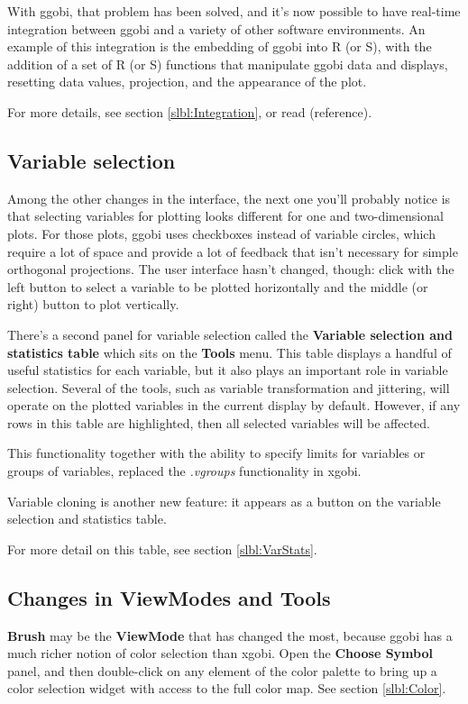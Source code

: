 \documentclass[11pt]{article}
\begin{document}
With ggobi, that problem has been solved, and it's now possible
to have real-time integration between ggobi and a variety of
other software environments.  An example of this integration is
the embedding of ggobi into R (or S), with the addition of a set of
R (or S) functions that manipulate ggobi data and displays,
resetting data values, projection, and the appearance of the plot.

For more details, see section \ref{slbl:Integration}, or read
(reference).

\subsection {Variable selection}

Among the other changes in the interface, the next one you'll
probably notice is that selecting variables for plotting looks
different for one and two-dimensional plots.  For those plots, ggobi
uses checkboxes instead of variable circles, which require a lot of
space and provide a lot of feedback that isn't necessary for simple
orthogonal projections.  The user interface hasn't changed, though:
click with the left button to select a variable to be plotted
horizontally and the middle (or right) button to plot vertically.

There's a second panel for variable selection called the {\bf
Variable selection and statistics table} which sits on the {\bf
Tools} menu.  This table displays a handful of useful statistics for
each variable, but it also plays an important role in variable
selection.  Several of the tools, such as variable transformation and
jittering, will operate on the plotted variables in the current
display by default.  However, if any rows in this table are highlighted,
then all selected variables will be affected. 

This functionality together with the ability to specify limits
for variables or groups of variables, replaced the {\em .vgroups}
functionality in xgobi.

Variable cloning is another new feature: it appears as a button
on the variable selection and statistics table.

For more detail on this table, see section \ref{slbl:VarStats}.

\subsection{Changes in ViewModes and Tools}

{\bf Brush} may be the {\bf ViewMode} that has changed the most,
because ggobi has a much richer notion of color selection than
xgobi.  Open the {\bf Choose Symbol} panel, and then double-click on
any element of the color palette to bring up a color selection widget
with access to the full color map.  See section \ref{slbl:Color}.
\end{document}
